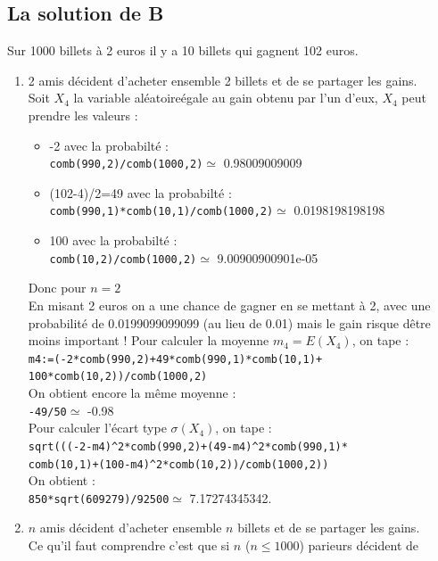 \documentclass[a4paper,11pt]{book}
\begin{document}
\subsection{La solution de B}
Sur 1000 billets \`a 2 euros il y a 10 billets qui gagnent 102 euros.\\
\begin{enumerate}
\item 2 amis d\'ecident d'acheter ensemble 2 billets et de se partager les gains.\\
Soit $X_4$ la variable al\'eatoire\'egale au gain obtenu par l'un d'eux,
$X_4$ peut prendre les valeurs :\\
\begin{itemize}
\item -2 avec la probabilt\'e :\\
{\tt comb(990,2)/comb(1000,2)}$\simeq$ 0.98009009009
\item (102-4)/2=49 avec la probabilt\'e :\\
{\tt comb(990,1)*comb(10,1)/comb(1000,2)}$\simeq$ 0.0198198198198
\item 100 avec la probabilt\'e :\\
{\tt comb(10,2)/comb(1000,2)}$\simeq$ 9.00900900901e-05
\end{itemize}
Donc pour $n=2$\\
En misant 2 euros on a une chance de gagner en se mettant \`a 2, avec une 
probabilit\'e de 0.0199099099099 (au lieu de 0.01) mais le gain risque d\^etre 
moins important !
Pour calculer la moyenne $m_4=E(X_4)$, on tape :\\
{\tt m4:=(-2*comb(990,2)+49*comb(990,1)*comb(10,1)+\\
100*comb(10,2))/comb(1000,2)}\\
On obtient encore la m\^eme moyenne :\\ 
{\tt -49/50}$\simeq$ -0.98\\
Pour calculer l'\'ecart type $\sigma(X_4)$, on tape :\\
{\tt  sqrt(((-2-m4)\verb|^|2*comb(990,2)+(49-m4)\verb|^|2*comb(990,1)*\\comb(10,1)+(100-m4)\verb|^|2*comb(10,2))/comb(1000,2))}\\
On obtient :\\ 
{\tt 850*sqrt(609279)/92500}$\simeq$ 7.17274345342.\\
\item $n$ amis d\'ecident d'acheter ensemble $n$ billets et de se partager les 
gains.\\
Ce qu'il faut comprendre c'est que si $n$ ($n\leq 1000$) parieurs d\'ecident de

\end{enumerate}
\end{document}
